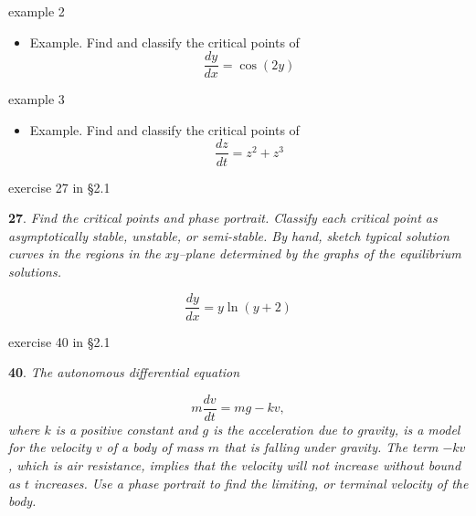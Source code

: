 \documentclass[colorlinks]{beamer}
\begin{document}
\begin{frame}{example 2}

\small
\begin{minipage}[t]{0.5\textwidth}
\begin{itemize}
\item Example. Find and classify the critical points of
   $$\frac{dy}{dx} = \cos(2y)$$

\vspace{40mm}
\end{itemize}
\end{minipage}
\end{frame}


\begin{frame}{example 3}

\small
\begin{minipage}[t]{0.5\textwidth}
\begin{itemize}
\item Example. Find and classify the critical points of
   $$\frac{dz}{dt} = z^2 + z^3$$

\vspace{40mm}
\end{itemize}
\end{minipage}
\end{frame}


\begin{frame}{exercise 27 in \S 2.1}

\small
\begin{minipage}[t]{0.45\textwidth}
\noindent \textbf{27}.  \emph{Find the critical points and phase portrait.  Classify each critical point as asymptotically stable, unstable, or semi-stable.  By hand, sketch typical solution curves in the regions in the $xy$--plane determined by the graphs of the equilibrium solutions.}

$$\frac{dy}{dx} = y \ln(y+2)$$
\end{minipage}

\vspace{20mm}
\end{frame}


\begin{frame}{exercise 40 in \S 2.1}

\small
\begin{minipage}[t]{0.5\textwidth}
\noindent \textbf{40}.  \emph{The autonomous differential equation}

\vspace{-2mm}
$$m \frac{dv}{dt} = m g - k v,$$
\emph{where $k$ is a positive constant and $g$ is the acceleration due to gravity, is a model for the velocity $v$ of a body of mass $m$ that is falling under gravity.  The term $-kv$, which is air resistance, implies that the velocity will not increase without bound as $t$ increases.  Use a phase portrait to find the limiting, or \emph{terminal} velocity of the body.}
\end{minipage}

\vspace{10mm}
\end{frame}
\end{document}

